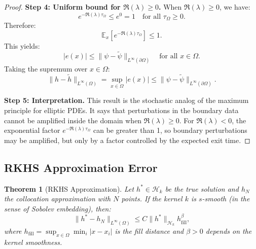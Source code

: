 \documentclass[11pt,a4paper]{article}
\newtheorem{theorem}{Theorem}[section]
\newcommand{\E}{\mathbb{E}}
\newcommand{\RKHS}{\mathcal{H}_k}
\begin{document}
\begin{proof}
\textbf{Step 4: Uniform bound for $\Re(\lambda) \geq 0$.}
When $\Re(\lambda) \geq 0$, we have:
\begin{equation}
e^{-\Re(\lambda) \tau_\Omega} \leq e^{0} = 1 \quad \text{for all } \tau_\Omega \geq 0.
\end{equation}
Therefore:
\begin{equation}
\E_x\left[e^{-\Re(\lambda) \tau_\Omega}\right] \leq 1.
\end{equation}
This yields:
\begin{equation}
|e(x)| \leq \|\psi - \tilde{\psi}\|_{L^\infty(\partial\Omega)} \quad \text{for all } x \in \Omega.
\end{equation}
Taking the supremum over $x \in \Omega$:
\begin{equation}
\|h - \tilde{h}\|_{L^\infty(\Omega)} = \sup_{x \in \Omega}|e(x)| \leq \|\psi - \tilde{\psi}\|_{L^\infty(\partial\Omega)}.
\end{equation}

\textbf{Step 5: Interpretation.}
This result is the stochastic analog of the maximum principle for elliptic PDEs. It says that perturbations in the boundary data cannot be amplified inside the domain when $\Re(\lambda) \geq 0$. For $\Re(\lambda) < 0$, the exponential factor $e^{-\Re(\lambda)\tau_\Omega}$ can be greater than 1, so boundary perturbations may be amplified, but only by a factor controlled by the expected exit time.
\end{proof}

\subsection{RKHS Approximation Error}

\begin{theorem}[RKHS Approximation]\label{thm:rkhs_approx}
Let $h^* \in \RKHS$ be the true solution and $h_N$ the collocation approximation with $N$ points. If the kernel $k$ is $s$-smooth (in the sense of Sobolev embedding), then:
\begin{equation}
\|h^* - h_N\|_{L^\infty(\Omega)} \leq C \|h^*\|_{\RKHS} h_{\mathrm{fill}}^\beta,
\end{equation}
where $h_{\mathrm{fill}} = \sup_{x \in \Omega} \min_i |x - x_i|$ is the fill distance and $\beta > 0$ depends on the kernel smoothness.
\end{theorem}
\end{document}
